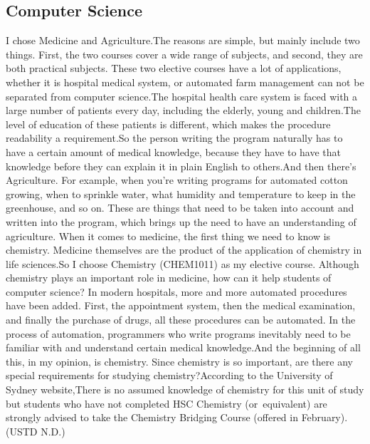 \documentclass[12pt]{article}
\begin{document}
\subsection{Computer Science}
I chose Medicine and Agriculture.The reasons are simple, but mainly include two things. First, the two courses cover a wide range of subjects, and second, they are both practical subjects.
These two elective courses have a lot of applications, whether it is hospital medical system, or automated farm management can not be separated from computer science.The hospital health care system is faced with a large number of patients every day, including the elderly, young and children.The level of education of these patients is different, which makes the procedure readability a requirement.So the person writing the program naturally has to have a certain amount of medical knowledge, because they have to have that knowledge before they can explain it in plain English to others.And then there's Agriculture. For example, when you're writing programs for automated cotton growing, when to sprinkle water, what humidity and temperature to keep in the greenhouse, and so on. These are things that need to be taken into account and written into the program, which brings up the need to have an understanding of agriculture.
When it comes to medicine, the first thing we need to know is chemistry. Medicine themselves are the product of the application of chemistry in life sciences.So I choose Chemistry (CHEM1011) as my elective course. Although chemistry plays an important role in medicine, how can it help students of computer science? In modern hospitals, more and more automated procedures have been added. First, the appointment system, then the medical examination, and finally the purchase of drugs, all these procedures can be automated. In the process of automation, programmers who write programs inevitably need to be familiar with and understand certain medical knowledge.And the beginning of all this, in my opinion, is chemistry. Since chemistry is so important, are there any special requirements for studying chemistry?According to the University of Sydney website,There is no assumed knowledge of chemistry for this unit of study but students who have not completed HSC Chemistry (or equivalent) are strongly advised to take the Chemistry Bridging Course (offered in February).(USTD N.D.)
\end{document}
